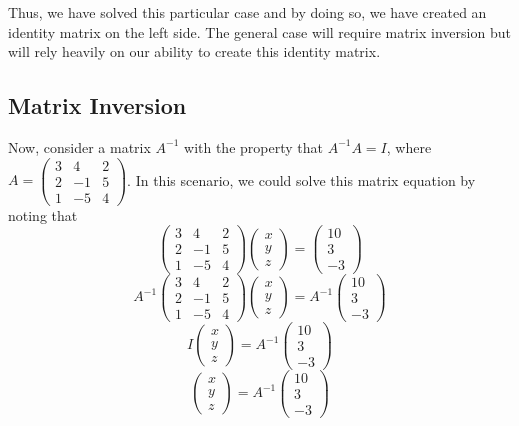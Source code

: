 \documentclass[
]{book}
\theoremstyle{definition}
\theoremstyle{definition}
\theoremstyle{definition}
\theoremstyle{definition}
\theoremstyle{remark}
\begin{document}
Thus, we have solved this particular case and by doing so, we have created an identity matrix on the left side. The general case will require matrix inversion but will rely heavily on our ability to create this identity matrix.

\hypertarget{matrix-inversion}{%
\subsection{Matrix Inversion}\label{matrix-inversion}}

Now, consider a matrix \(A^{-1}\) with the property that \(A^{-1}A = I\), where \(A = \begin{pmatrix}3 & 4 & 2\\ 2 & -1 & 5\\ 1 & -5 & 4 \end{pmatrix}\). In this scenario, we could solve this matrix equation by noting that \[\begin{pmatrix}3 & 4 & 2\\ 2 & -1 & 5\\ 1 & -5 & 4 \end{pmatrix} \begin{pmatrix}x \\ y \\ z \end{pmatrix} = \begin{pmatrix}10 \\ 3 \\ -3 \end{pmatrix}\]
\[A^{-1}\begin{pmatrix}3 & 4 & 2\\ 2 & -1 & 5\\ 1 & -5 & 4 \end{pmatrix} \begin{pmatrix}x \\ y \\ z \end{pmatrix} = A^{-1}\begin{pmatrix}10 \\ 3 \\ -3 \end{pmatrix}\]
\[I \begin{pmatrix}x \\ y \\ z \end{pmatrix} = A^{-1}\begin{pmatrix}10 \\ 3 \\ -3 \end{pmatrix}\]
\[\begin{pmatrix}x \\ y \\ z \end{pmatrix} = A^{-1}\begin{pmatrix}10 \\ 3 \\ -3 \end{pmatrix}\]
\end{document}
